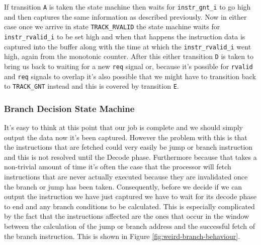 If transition \texttt{A} is taken the state machine then waits for \texttt{instr\_gnt\_i} to go high and then captures the same information as described previously. Now in either case once we arrive in state \texttt{TRACK\_RVALID} the state machine waits for \texttt{instr\_rvalid\_i} to be set high and when that happens the instruction data is captured into the buffer along with the time at which the \texttt{instr\_rvalid\_i} went high, again from the monotonic counter. After this either transition \texttt{D} is taken to bring us back to waiting for a new \texttt{req} signal or, because it's possible for \texttt{rvalid} and \texttt{req} signals to overlap it's also possible that we might have to transition back to \texttt{TRACK\_GNT} instead and this is covered by transition \texttt{E}. 

\subsubsection{Branch Decision State Machine}

It's easy to think at this point that our job is complete and we should simply output the data now it's been captured. However the problem with this is that the instructions that are fetched could very easily be jump or branch instruction and this is not resolved until the Decode phase. Furthermore because that takes a non-trivial amount of time it's often the case that the processor will fetch instructions that are never actually executed because they are invalidated once the branch or jump has been taken. Consequently, before we decide if we can output the instruction we have just captured we have to wait for its decode phase to end and any branch conditions to be calculated. This is especially complicated by the fact that the instructions affected are the ones that occur in the window between the calculation of the jump or branch address and the successful fetch of the branch instruction. This is shown in Figure \ref{fig:weird-branch-behaviour}.

